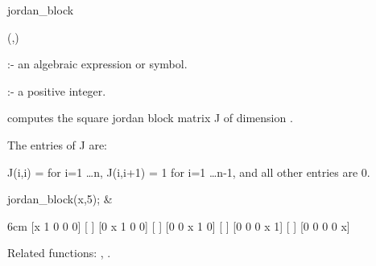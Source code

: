 \begin{Operator}{jordan_block}

\begin{Syntax}
(,)
\end{Syntax}

         :- an algebraic expression or symbol. 

 :- a positive integer.

 computes the square jordan block matrix J of 
dimension . 

The entries of J are:

                J(i,i) =  for i=1 
                \ldots n, J(i,i+1) = 1 for i=1 
                \ldots n-1, and all other entries are 0.

\begin{Examples}

jordan\_block(x,5); &
\begin{multilineoutput}{6cm}
[x  1  0  0  0]
[             ]
[0  x  1  0  0]
[             ]
[0  0  x  1  0]
[             ]
[0  0  0  x  1]
[             ]
[0  0  0  0  x]
\end{multilineoutput}

\end{Examples}

Related functions: , .

\end{Operator}


